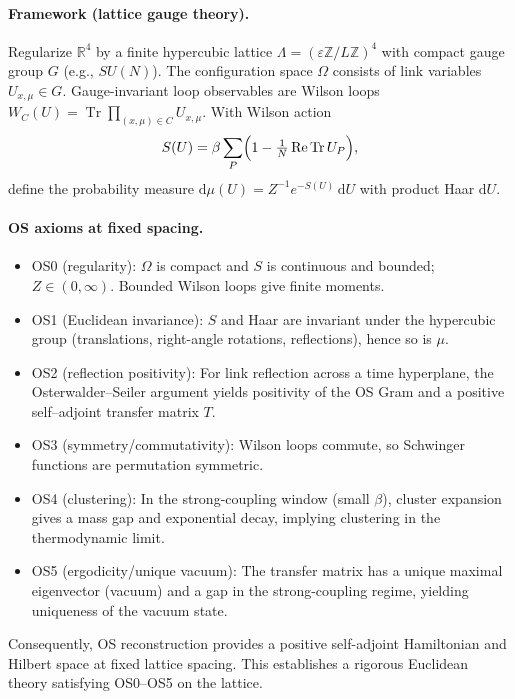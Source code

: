 \documentclass[11pt]{amsart}
\theoremstyle{plain}
\theoremstyle{definition}
\theoremstyle{remark}
\renewcommand{\tfrac}[2]{\textstyle\frac{#1}{#2}}
\begin{document}
\paragraph{Framework (lattice gauge theory).}
Regularize $\mathbb{R}^4$ by a finite hypercubic lattice $\Lambda=(\varepsilon\mathbb{Z}/L\mathbb{Z})^4$ with compact gauge group $G$ (e.g., $SU(N)$). The configuration space $\Omega$ consists of link variables $U_{x,\mu}\in G$. Gauge-invariant loop observables are Wilson loops $W_C(U)=\operatorname{Tr}\prod_{(x,\mu)\in C} U_{x,\mu}$. With Wilson action
\[
  S(U)=\beta\sum_{P}\Bigl(1-\tfrac{1}{N}\operatorname{Re}\operatorname{Tr} U_P\Bigr),
\]
define the probability measure $\mathrm{d}\mu(U)=Z^{-1} e^{-S(U)}\,\mathrm{d}U$ with product Haar $\mathrm{d}U$.

\paragraph{OS axioms at fixed spacing.}
\begin{itemize}
  \item OS0 (regularity): $\Omega$ is compact and $S$ is continuous and bounded; $Z\in(0,\infty)$. Bounded Wilson loops give finite moments.
  \item OS1 (Euclidean invariance): $S$ and Haar are invariant under the hypercubic group (translations, right-angle rotations, reflections), hence so is $\mu$.
  \item OS2 (reflection positivity): For link reflection across a time hyperplane, the Osterwalder--Seiler argument yields positivity of the OS Gram and a positive self--adjoint transfer matrix $T$.
  \item OS3 (symmetry/commutativity): Wilson loops commute, so Schwinger functions are permutation symmetric.
  \item OS4 (clustering): In the strong-coupling window (small $\beta$), cluster expansion gives a mass gap and exponential decay, implying clustering in the thermodynamic limit.
  \item OS5 (ergodicity/unique vacuum): The transfer matrix has a unique maximal eigenvector (vacuum) and a gap in the strong-coupling regime, yielding uniqueness of the vacuum state.
\end{itemize}
Consequently, OS reconstruction provides a positive self-adjoint Hamiltonian and Hilbert space at fixed lattice spacing. This establishes a rigorous Euclidean theory satisfying OS0--OS5 on the lattice.
\end{document}
